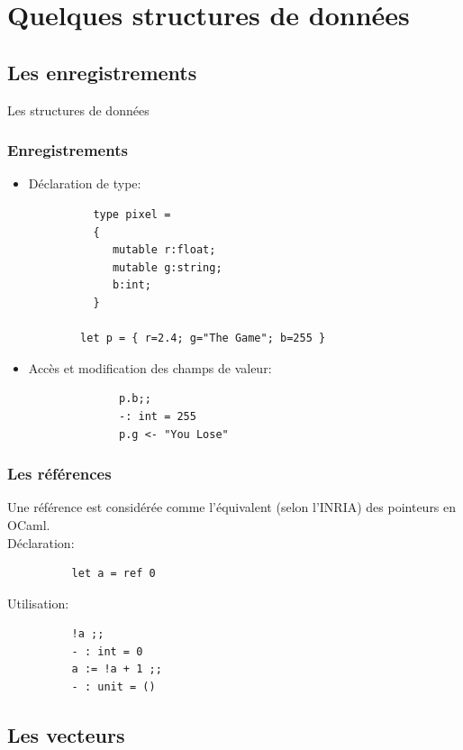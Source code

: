 
\section{Quelques structures de données}
\subsection{Les enregistrements}

\begin{frame}
	\begin{center}
		\huge 
		Les structures de données
	\end{center}
\end{frame}


\begin{frame}[fragile]
	\frametitle{Enregistrements}
	\begin{itemize}
	\item Déclaration de type: 
		\begin{lstlisting}
		  type pixel = 
		  { 
		     mutable r:float; 
		     mutable g:string; 
		     b:int;
		  } 
		
		let p = { r=2.4; g="The Game"; b=255 }
		\end{lstlisting}
	\item Accès et modification des champs de valeur:
		\begin{lstlisting}
			  p.b;;
			  -: int = 255
			  p.g <- "You Lose"
		\end{lstlisting}
	\end{itemize}
\end{frame}


\begin{frame}[fragile]
	\frametitle{Les références}
	Une référence est considérée comme l'équivalent (selon l'INRIA) des pointeurs en OCaml.\\
	Déclaration:
	\begin{lstlisting}
		  let a = ref 0

	\end{lstlisting}
	Utilisation:
	\begin{lstlisting}
		  !a ;;
		  - : int = 0
		  a := !a + 1 ;;
		  - : unit = ()
	\end{lstlisting}

\end{frame}

\subsection{Les vecteurs}

